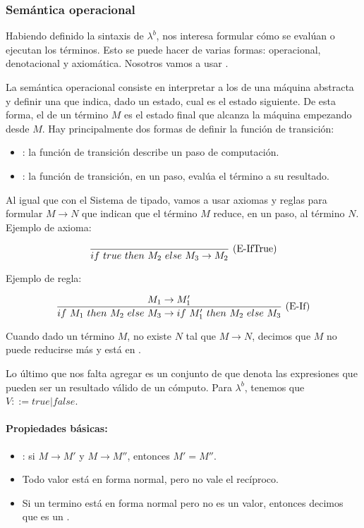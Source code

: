 \subsubsection{Semántica operacional}

Habiendo definido la sintaxis de $\lambda^b$, nos interesa formular cómo se evalúan o ejecutan los términos. Esto se puede hacer de varias formas: operacional, denotacional y axiomática. Nosotros vamos a usar .

La semántica operacional consiste en interpretar a los  de una máquina abstracta y definir una  que indica, dado un estado, cual es el estado siguiente. De esta forma, el  de un término $M$ es el estado final que alcanza la máquina empezando desde $M$. Hay principalmente dos formas de definir la función de transición:

\begin{itemize}
  \item {}: la función de transición describe un paso de computación.
  \item {}: la función de transición, en un paso, evalúa el término a su resultado.
\end{itemize}

Al igual que con el Sistema de tipado, vamos a usar axiomas y reglas para formular  $M\to N$ que indican que el término $M$ reduce, en un paso, al término $N$. Ejemplo de axioma:

\[\frac{}{if\ true\ then\ M_2\ else\ M_3 \to M_2}\ \text{(E-IfTrue)}\]

Ejemplo de regla:

\[\frac{M_1 \to M_1'}{if\ M_1\ then\ M_2\ else\ M_3 \to if\ M_1'\ then\ M_2\ else\ M_3}\ \text{(E-If)}\]

Cuando dado un término $M$, no existe $N$ tal que $M\to N$, decimos que $M$ no puede reducirse más y está en .

Lo último que nos falta agregar es un conjunto de  que denota las expresiones que pueden ser un resultado válido de un cómputo. Para $\lambda^b$, tenemos que $V ::= true \vert false$.

\paragraph{Propiedades básicas:}

\begin{itemize}
  \item {}: si $M \to M'$ y $M \to M''$, entonces $M'= M''$.
  \item Todo valor está en forma normal, pero no vale el recíproco.
  \item Si un termino está en forma normal pero no es un valor, entonces decimos que es un .
\end{itemize}


